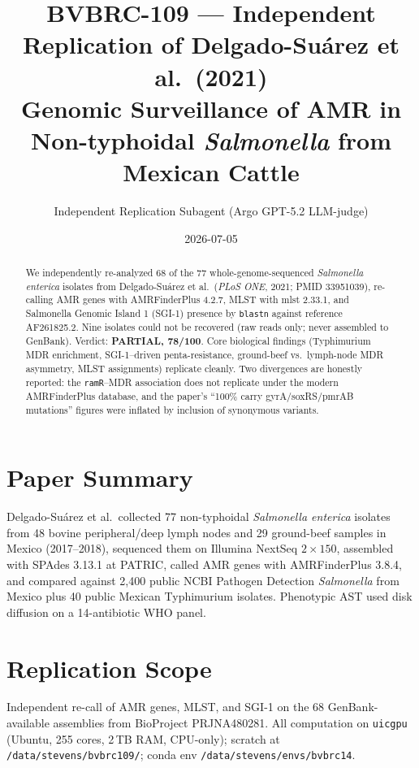\documentclass[11pt]{article}
\title{BVBRC-109 --- Independent Replication of Delgado-Su\'arez et al.\ (2021)\\
\large Genomic Surveillance of AMR in Non-typhoidal \emph{Salmonella} from Mexican Cattle}
\author{Independent Replication Subagent (Argo GPT-5.2 LLM-judge)}
\date{2026-07-05}
\begin{document}
\maketitle

\begin{abstract}
We independently re-analyzed 68 of the 77 whole-genome-sequenced \emph{Salmonella enterica} isolates from Delgado-Su\'arez et al.\ (\emph{PLoS ONE}, 2021; PMID 33951039), re-calling AMR genes with AMRFinderPlus 4.2.7, MLST with mlst 2.33.1, and Salmonella Genomic Island 1 (SGI-1) presence by \texttt{blastn} against reference AF261825.2. Nine isolates could not be recovered (raw reads only; never assembled to GenBank). Verdict: \textbf{PARTIAL, 78/100}. Core biological findings (Typhimurium MDR enrichment, SGI-1--driven penta-resistance, ground-beef vs.\ lymph-node MDR asymmetry, MLST assignments) replicate cleanly. Two divergences are honestly reported: the \texttt{ramR}--MDR association does not replicate under the modern AMRFinderPlus database, and the paper's ``100\% carry gyrA/soxRS/pmrAB mutations'' figures were inflated by inclusion of synonymous variants.
\end{abstract}

\section{Paper Summary}
Delgado-Su\'arez et al.\ collected 77 non-typhoidal \emph{Salmonella enterica} isolates from 48 bovine peripheral/deep lymph nodes and 29 ground-beef samples in Mexico (2017--2018), sequenced them on Illumina NextSeq $2\times150$, assembled with SPAdes 3.13.1 at PATRIC, called AMR genes with AMRFinderPlus 3.8.4, and compared against 2{,}400 public NCBI Pathogen Detection \emph{Salmonella} from Mexico plus 40 public Mexican Typhimurium isolates. Phenotypic AST used disk diffusion on a 14-antibiotic WHO panel.

\section{Replication Scope}
Independent re-call of AMR genes, MLST, and SGI-1 on the 68 GenBank-available assemblies from BioProject PRJNA480281. All computation on \texttt{uicgpu} (Ubuntu, 255 cores, 2\,TB RAM, CPU-only); scratch at \texttt{/data/stevens/bvbrc109/}; conda env \texttt{/data/stevens/envs/bvbrc14}.
\end{document}

